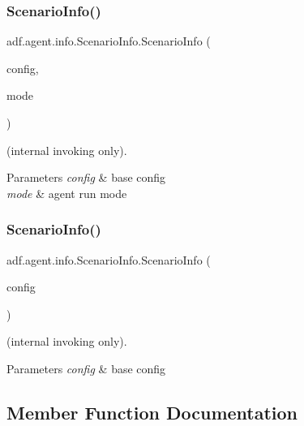 \subsubsection{\texorpdfstring{Scenario\+Info()}{ScenarioInfo()}\hspace{0.1cm}{\footnotesize\ttfamily [1/2]}}
{\footnotesize\ttfamily adf.\+agent.\+info.\+Scenario\+Info.\+Scenario\+Info (\begin{DoxyParamCaption}\item[{Config}]{config,  }\item[{\hyperlink{enumadf_1_1agent_1_1info_1_1ScenarioInfo_1_1Mode}{Mode}}]{mode }\end{DoxyParamCaption})}



(internal invoking only). 


\begin{DoxyParams}{Parameters}
{\em config} & base config \\
\hline
{\em mode} & agent run mode \\
\hline
\end{DoxyParams}
\hypertarget{classadf_1_1agent_1_1info_1_1ScenarioInfo_a6150d210d4172e378c6d427ae48ce6ab}{}\label{classadf_1_1agent_1_1info_1_1ScenarioInfo_a6150d210d4172e378c6d427ae48ce6ab} 
\subsubsection{\texorpdfstring{Scenario\+Info()}{ScenarioInfo()}\hspace{0.1cm}{\footnotesize\ttfamily [2/2]}}
{\footnotesize\ttfamily adf.\+agent.\+info.\+Scenario\+Info.\+Scenario\+Info (\begin{DoxyParamCaption}\item[{Config}]{config }\end{DoxyParamCaption})}



(internal invoking only). 


\begin{DoxyParams}{Parameters}
{\em config} & base config \\
\hline
\end{DoxyParams}


\subsection{Member Function Documentation}
\hypertarget{classadf_1_1agent_1_1info_1_1ScenarioInfo_afc3003e18c38d96a6466b09afd95ca82}{}\label{classadf_1_1agent_1_1info_1_1ScenarioInfo_afc3003e18c38d96a6466b09afd95ca82} 
